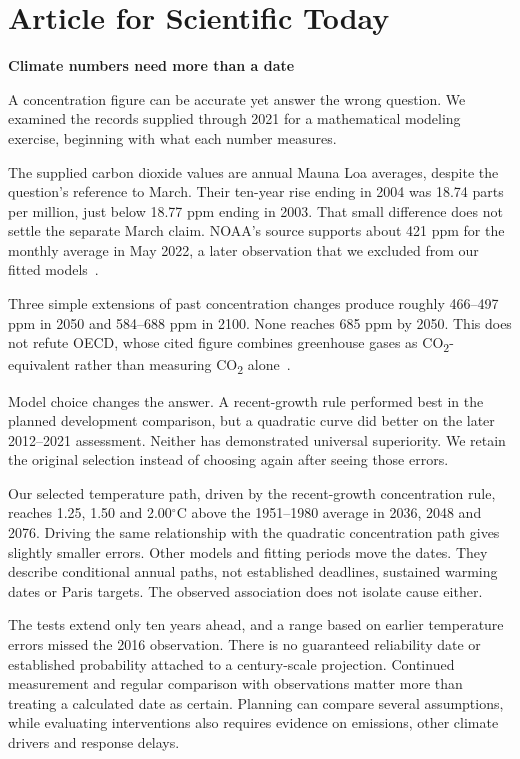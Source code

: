 \documentclass[11pt,a4paper]{article}
\newcommand{\p}[2]{#2\par}
\newcommand{\CO}{CO\textsubscript{2}}
\newcommand{\degC}{\ensuremath{{}^{\circ}\mathrm{C}}}
\begin{document}
\section{Article for Scientific Today}\label{sec:article}
\begin{center}{\large\bfseries Climate numbers need more than a date}\end{center}
\p{ART01}{A concentration figure can be accurate yet answer the wrong question. We examined the records supplied through 2021 for a mathematical modeling exercise, beginning with what each number measures.}
\p{ART02}{The supplied carbon dioxide values are annual Mauna Loa averages, despite the question's reference to March. Their ten-year rise ending in 2004 was 18.74 parts per million, just below 18.77 ppm ending in 2003. That small difference does not settle the separate March claim. NOAA's source supports about 421 ppm for the monthly average in May 2022, a later observation that we excluded from our fitted models~\cite{problem,workbook,noaa-data,noaa-news}.}
\p{ART03}{Three simple extensions of past concentration changes produce roughly 466--497 ppm in 2050 and 584--688 ppm in 2100. None reaches 685 ppm by 2050. This does not refute OECD, whose cited figure combines greenhouse gases as \CO{}-equivalent rather than measuring \CO{} alone~\cite{oecd}.}
\p{ART04}{Model choice changes the answer. A recent-growth rule performed best in the planned development comparison, but a quadratic curve did better on the later 2012--2021 assessment. Neither has demonstrated universal superiority. We retain the original selection instead of choosing again after seeing those errors.}
\p{ART05}{Our selected temperature path, driven by the recent-growth concentration rule, reaches 1.25, 1.50 and 2.00\degC{} above the 1951--1980 average in 2036, 2048 and 2076. Driving the same relationship with the quadratic concentration path gives slightly smaller errors. Other models and fitting periods move the dates. They describe conditional annual paths, not established deadlines, sustained warming dates or Paris targets. The observed association does not isolate cause either.}
\p{ART06}{The tests extend only ten years ahead, and a range based on earlier temperature errors missed the 2016 observation. There is no guaranteed reliability date or established probability attached to a century-scale projection. Continued measurement and regular comparison with observations matter more than treating a calculated date as certain. Planning can compare several assumptions, while evaluating interventions also requires evidence on emissions, other climate drivers and response delays.}
\end{document}
